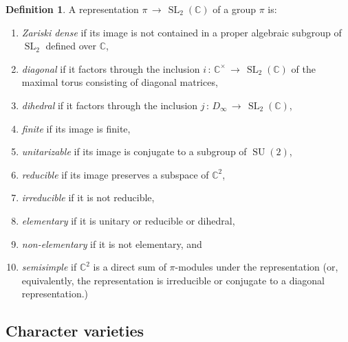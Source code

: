 \documentclass[reqno]{amsart}
\theoremstyle{plain}
\theoremstyle{definition}
\newtheorem{definition}[theorem]{Definition}
\theoremstyle{remark}
\newcommand{\C}{{\mathbb{C}}}
\DeclareMathOperator{\SL}{SL}
\DeclareMathOperator{\SU}{SU}
\begin{document}
\begin{definition}
A representation $\pi\,\to\,\SL_2(\C)$ of a group $\pi$ is:
	\begin{enumerate}
\item[\textup{(1)}] \emph{Zariski dense} if its image is not contained in a proper algebraic subgroup of $\SL_2$ defined over $\C$,

\item[\textup{(2)}] \emph{diagonal} if it factors through the inclusion $i\,:\,\C^\times\,\to\,\SL_2(\C)$ of the maximal 
torus consisting of diagonal matrices,

\item[\textup{(3)}] \emph{dihedral} if it factors through the inclusion $j\,:\,D_\infty\,\to\,\SL_2(\C)$, 

\item[\textup{(4)}] \emph{finite} if its image is finite,

\item[\textup{(5)}] \emph{unitarizable} if its image is conjugate to a subgroup of  $\SU(2)$,

\item[\textup{(6)}] \emph{reducible} if its image preserves a subspace of $\C^2$, 

\item[\textup{(7)}] \emph{irreducible} if it is not reducible,

\item[\textup{(8)}] \emph{elementary} if it is unitary or reducible or dihedral, 

\item[\textup{(9)}] \emph{non-elementary} if it is not elementary, and

\item[\textup{(10)}] \emph{semisimple} if $\C^2$ is a direct sum of $\pi$-modules under the representation (or, 
equivalently, the representation is irreducible or conjugate to a diagonal representation.)
\end{enumerate}
\end{definition}

\subsection{Character varieties} \label{sect:2.2}
\end{document}
